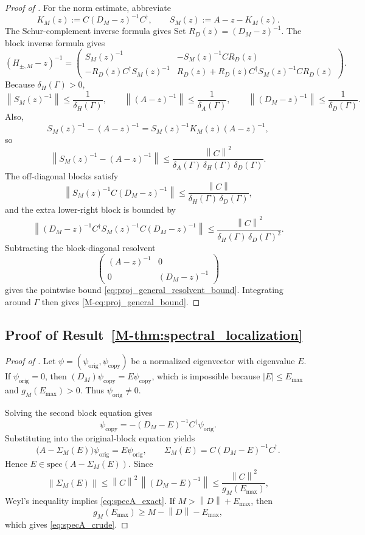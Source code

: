 \documentclass[11pt]{article}
\numberwithin{equation}{section}
\theoremstyle{definition}
\theoremstyle{remark}
\newcommand{\spec}{\mathrm{spec}}
\newcommand{\opnorm}[1]{\left\lVert#1\right\rVert}
\begin{document}
\begin{proof}[Proof of ]
For the norm estimate, abbreviate
\[
K_M(z):=C(D_M-z)^{-1}C^\dagger,
\qquad
S_M(z):=A-z-K_M(z).
\]
The Schur-complement inverse formula gives
Set \(R_D(z)=(D_M-z)^{-1}\). The block inverse formula gives
\[
(H_{\pm,M}-z)^{-1}=
\begin{pmatrix}
S_M(z)^{-1}&-S_M(z)^{-1}CR_D(z)\\[0.4em]
-R_D(z)C^\dagger S_M(z)^{-1}&R_D(z)+R_D(z)C^\dagger S_M(z)^{-1}CR_D(z)
\end{pmatrix}.
\]
Because $\delta_H(\Gamma)>0$,
\[
\opnorm{S_M(z)^{-1}}\le \frac{1}{\delta_H(\Gamma)},
\qquad
\opnorm{(A-z)^{-1}}\le \frac{1}{\delta_A(\Gamma)},
\qquad
\opnorm{(D_M-z)^{-1}}\le \frac{1}{\delta_D(\Gamma)}.
\]
Also,
\[
S_M(z)^{-1}-(A-z)^{-1}=S_M(z)^{-1}K_M(z)(A-z)^{-1},
\]
so
\[
\opnorm{S_M(z)^{-1}-(A-z)^{-1}}
\le
\frac{\opnorm{C}^2}{\delta_A(\Gamma)\,\delta_H(\Gamma)\,\delta_D(\Gamma)}.
\]
The off-diagonal blocks satisfy
\[
\opnorm{S_M(z)^{-1}C(D_M-z)^{-1}}
\le
\frac{\opnorm{C}}{\delta_H(\Gamma)\,\delta_D(\Gamma)},
\]
and the extra lower-right block is bounded by
\[
\opnorm{(D_M-z)^{-1}C^\dagger S_M(z)^{-1}C(D_M-z)^{-1}}
\le
\frac{\opnorm{C}^2}{\delta_H(\Gamma)\,\delta_D(\Gamma)^2}.
\]
Subtracting the block-diagonal resolvent
\[
\begin{pmatrix}
(A-z)^{-1}&0\\[0.2em]
0&(D_M-z)^{-1}
\end{pmatrix}
\]
gives the pointwise bound \eqref{eq:proj_general_resolvent_bound}. Integrating around $\Gamma$
then gives \eqref{M-eq:proj_general_bound}.
\end{proof}

\subsection{Proof of Result~\ref{M-thm:spectral_localization}}\label{app:proof:thm:spectral_localization}
\begin{proof}[Proof of ]
Let $\psi=(\psi_{\mathrm{orig}},\psi_{\mathrm{copy}})$ be a normalized eigenvector with eigenvalue $E$. If $\psi_{\mathrm{orig}}=0$, then $(D_M)\psi_{\mathrm{copy}}=E\psi_{\mathrm{copy}}$, which is impossible because $|E|\le E_{\max}$ and $g_M(E_{\max})>0$. Thus $\psi_{\mathrm{orig}}\neq0$.

Solving the second block equation gives
\[
\psi_{\mathrm{copy}}=-(D_M-E)^{-1}C^\dagger\psi_{\mathrm{orig}}.
\]
Substituting into the original-block equation yields
\[
\bigl(A-\Sigma_M(E)\bigr)\psi_{\mathrm{orig}}=E\psi_{\mathrm{orig}},
\qquad
\Sigma_M(E)=C(D_M-E)^{-1}C^\dagger.
\]
Hence $E\in\spec(A-\Sigma_M(E))$. Since
\[
\opnorm{\Sigma_M(E)}
\le
\opnorm{C}^2\,\opnorm{(D_M-E)^{-1}}
\le \frac{\opnorm{C}^2}{g_M(E_{\max})},
\]
Weyl's inequality implies \eqref{eq:specA_exact}. If $M>\opnorm{D}+E_{\max}$, then
\[
g_M(E_{\max})\ge M-\opnorm{D}-E_{\max},
\]
which gives \eqref{eq:specA_crude}.
\end{proof}
\end{document}
